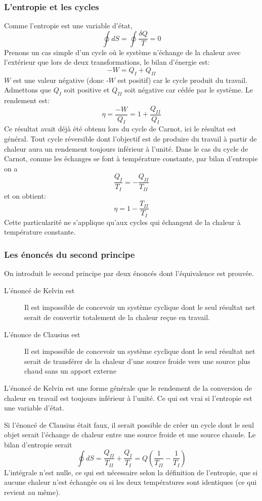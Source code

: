 \subsubsection{L'entropie et les cycles}
Comme l'entropie est une variable d'état,
\[ \oint dS = \oint \frac{\delta Q}{T} = 0 \]
Prenons un cas simple d'un cycle où le système n'échange de la chaleur
avec l'extérieur que lors de deux transformations, le bilan d'énergie est:
\[ -W = Q_I+Q_{II} \]
$W$ est une valeur négative (donc -$W$ est positif)
car le cycle produit du travail.
Admettons que $Q_I$ soit positive et $Q_{II}$
soit négative car cédée par le système.
Le rendement est:
\[  \eta = \frac{-W}{Q_I} = 1+\frac{Q_{II}}{Q_I} \]
Ce résultat avait déjà été obtenu lors du cycle de Carnot,
ici le résultat est général.
Tout cycle réversible dont l'objectif est de produire du travail
à partir de chaleur aura un rendement toujours inférieur à l'unité.
Dans le cas du cycle de Carnot, comme les échanges se font
à température constante, par bilan d'entropie on a
\[ \frac{Q_I}{T_I} = - \frac{Q_{II}}{T_{II}} \]
et on obtient:
\[ \eta = 1 - \frac {T_{II}}{T_I} \]
Cette particularité ne s'applique qu'aux cycles qui
échangent de la chaleur à température constante.

\subsubsection{Les énoncés du second principe}
On introduit le second principe par deux énoncés dont l'équivalence est prouvée.

\begin{description}
  \item[L'énoncé de Kelvin est]
    Il est impossible de concevoir un système cyclique dont le seul résultat net
    serait de convertir totalement de la chaleur reçue en travail.
  \item[L'énonce de Clausius est]
    Il est impossible de concevoir un système cyclique dont
    le seul résultat net serait de transférer de la chaleur
    d'une source froide vers une source plus chaud sans un apport externe
\end{description}
L'énoncé de Kelvin est une forme générale que le rendement de la conversion
de chaleur en travail est toujours inférieur à l'unité.
Ce qui est vrai si l'entropie est une variable d'état.

Si l'énoncé de Clausius était faux, il serait possible de créer
un cycle dont le seul objet serait l'échange de chaleur
entre une source froide et une source chaude.
Le bilan d'entropie serait
\[ \oint dS = \frac{Q_{II}}{T_{II}}+\frac{Q_I}{T_I} =
Q\left(\frac 1 {T_{II}} - \frac 1 {T_I}\right) \]
L'intégrale n'est nulle,
ce qui est nécessaire selon la définition de l'entropie,
que si aucune chaleur n'est échangée ou si les deux températures sont
identiques (ce qui revient au même).

